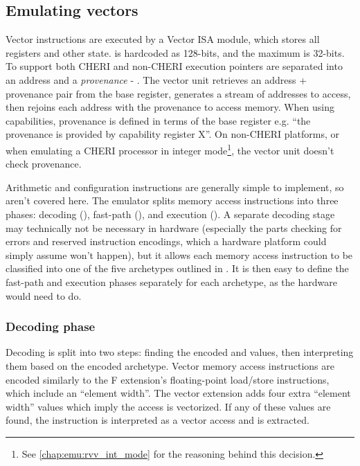 \subsection{Emulating vectors}

Vector instructions are executed by a Vector ISA module, which stores all registers and other state.
 is hardcoded as 128-bits, and the maximum  is  32-bits.
To support both CHERI and non-CHERI execution pointers are separated into an address and a \emph{provenance} - .
The vector unit retrieves an address + provenance pair from the base register, generates a stream of addresses to access, then rejoins each address with the provenance to access memory.
When using capabilities, provenance is defined in terms of the base register e.g. \enquote{the provenance is provided by capability register X}.
On non-CHERI platforms, or when emulating a CHERI processor in integer mode\footnote{See \cref{chap:emu:rvv_int_mode} for the reasoning behind this decision.}, the vector unit doesn't check provenance.

Arithmetic and configuration instructions are generally simple to implement, so aren't covered here.
The emulator splits memory access instructions into three phases: decoding (\todoref{}), fast-path (\todoref{}), and execution (\todoref{}).
A separate decoding stage may technically not be necessary in hardware (especially the parts checking for errors and reserved instruction encodings, which a hardware platform could simply assume won't happen), but it allows each memory access instruction to be classified into one of the five archetypes outlined in .
It is then easy to define the fast-path and execution phases separately for each archetype, as the hardware would need to do.

\subsubsection{Decoding phase}
Decoding is split into two steps: finding the encoded  and  values, then interpreting them based on the encoded archetype.
Vector memory access instructions are encoded similarly to the F extension's floating-point load/store instructions, which include an ``element width''.
The vector extension adds four extra ``element width'' values which imply the access is vectorized.
If any of these values are found, the instruction is interpreted as a vector access and  is extracted.

